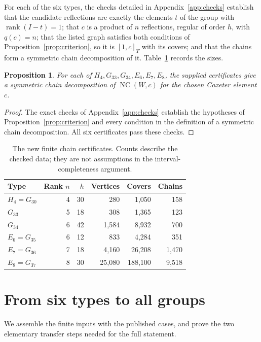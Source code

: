 \documentclass[11pt]{article}
\newtheorem{proposition}[theorem]{Proposition}
\theoremstyle{definition}
\newcommand{\NC}{\operatorname{NC}}
\newcommand{\rank}{\operatorname{rank}}
\begin{document}
For each of the six types, the checks detailed in
Appendix~\ref{app:checks} establish that the candidate reflections are
exactly the elements $t$ of the group with $\rank(I-t)=1$; that $c$ is
a product of $n$ reflections, regular of order $h$, with $q(c)=n$;
that the listed graph satisfies both conditions of
Proposition~\ref{prop:criterion}, so it is $[1,c]_T$ with its covers;
and that the chains form a symmetric chain decomposition of it.
Table~\ref{tab:finite} records the sizes.

\begin{proposition}\label{prop:six}
For each of $H_4,G_{33},G_{34},E_6,E_7,E_8$, the supplied certificates
give a symmetric chain decomposition of $\NC(W,c)$ for the chosen
Coxeter element $c$.
\end{proposition}
\begin{proof}
The exact checks of Appendix~\ref{app:checks} establish the hypotheses of
Proposition~\ref{prop:criterion} and every condition in the definition
of a symmetric chain decomposition. All six certificates pass these
checks.
\end{proof}

\begin{table}[ht]
\centering
\caption{The new finite chain certificates. Counts describe the checked
data; they are not assumptions in the interval-completeness argument.}
\label{tab:finite}
\begin{tabular}{@{}lrrrrr@{}}
\toprule
Type & Rank $n$ & $h$ & Vertices & Covers & Chains\\
\midrule
$H_4=G_{30}$ &4&30&280&1,050&158\\
$G_{33}$ &5&18&308&1,365&123\\
$G_{34}$ &6&42&1,584&8,932&700\\
$E_6=G_{35}$ &6&12&833&4,284&351\\
$E_7=G_{36}$ &7&18&4,160&26,208&1,470\\
$E_8=G_{37}$ &8&30&25,080&188,100&9,518\\
\bottomrule
\end{tabular}
\end{table}

\section{From six types to all groups}\label{sec:reduction}
We assemble the finite inputs with the published cases, and prove the
two elementary transfer steps needed for the full statement.
\end{document}

